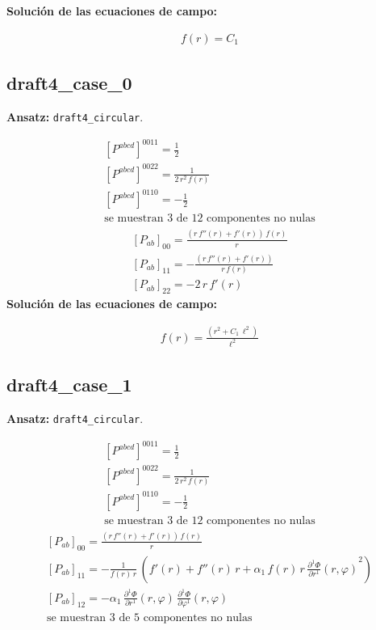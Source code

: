 \documentclass[10pt]{article}
\begin{document}
\noindent\textbf{Solución de las ecuaciones de campo:}\par
\[\begin{aligned}f\!\left(r\right)=C_{1}\end{aligned}\]
\subsection*{draft4\_case\_0}
\textbf{Ansatz:} \texttt{draft4\_circular}.\par
\[\begin{aligned}\left[P^{abcd}\right]^{0011}=\frac{1}{2}\\[2pt]\left[P^{abcd}\right]^{0022}=\frac{1}{2\,{r}^{2}\,f\!\left(r\right)}\\[2pt]\left[P^{abcd}\right]^{0110}=-\frac{1}{2}\\[2pt]\text{se muestran 3 de 12 componentes no nulas}\end{aligned}\]
\[\begin{aligned}\left[P_{ab}\right]_{00}=\frac{\left(r\,f''\!\left(r\right) + f'\!\left(r\right)\right)\,f\!\left(r\right)}{r}\\[2pt]\left[P_{ab}\right]_{11}=-\frac{\left(r\,f''\!\left(r\right) + f'\!\left(r\right)\right)}{r\,f\!\left(r\right)}\\[2pt]\left[P_{ab}\right]_{22}=-2\,r\,f'\!\left(r\right)\end{aligned}\]
\noindent\textbf{Solución de las ecuaciones de campo:}\par
\[\begin{aligned}f\!\left(r\right)=\frac{\left({r}^{2} + C_{1}\,{\ell}^{2}\right)}{{\ell}^{2}}\end{aligned}\]
\subsection*{draft4\_case\_1}
\textbf{Ansatz:} \texttt{draft4\_circular}.\par
\[\begin{aligned}\left[P^{abcd}\right]^{0011}=\frac{1}{2}\\[2pt]\left[P^{abcd}\right]^{0022}=\frac{1}{2\,{r}^{2}\,f\!\left(r\right)}\\[2pt]\left[P^{abcd}\right]^{0110}=-\frac{1}{2}\\[2pt]\text{se muestran 3 de 12 componentes no nulas}\end{aligned}\]
\[\begin{aligned}\left[P_{ab}\right]_{00}=\frac{\left(r\,f''\!\left(r\right) + f'\!\left(r\right)\right)\,f\!\left(r\right)}{r}\\[2pt]\left[P_{ab}\right]_{11}=-\frac{1}{f\!\left(r\right)\,r}\,\left(f'\!\left(r\right) + f''\!\left(r\right)\,r + \alpha_{1}\,f\!\left(r\right)\,r\,{\frac{\partial^{1} \Phi}{\partial r^{1}}\!\left(r, \varphi\right)}^{2}\right)\\[2pt]\left[P_{ab}\right]_{12}=-\alpha_{1}\,\frac{\partial^{1} \Phi}{\partial r^{1}}\!\left(r, \varphi\right)\,\frac{\partial^{1} \Phi}{\partial \varphi^{1}}\!\left(r, \varphi\right)\\[2pt]\text{se muestran 3 de 5 componentes no nulas}\end{aligned}\]
\end{document}
